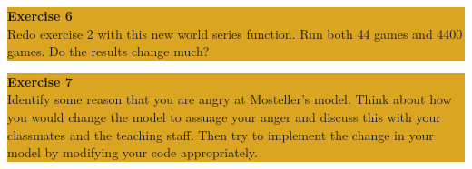 \documentclass[12pt]{amsart}
\begin{document}
\vskip 1cm
\begin{center}
\colorbox{Goldenrod}{\parbox{15cm}{
{
\textbf{\large Exercise 6}\vspace{1mm} \\
Redo exercise 2 with this new world series function. Run both 44 games and 4400 games. Do
the results change much?
}}}
\end{center}
\vskip 1cm

\begin{center}
\colorbox{Goldenrod}{\parbox{15cm}{
{
\textbf{\large Exercise 7}\vspace{1mm} \\
Identify some reason that you are angry at Mosteller's model. Think about how you would
change the model to assuage your anger and discuss this with your classmates and the teaching staff.  Then try to implement the change in your model by modifying your code appropriately.
}}}
\end{center}


\end{document}
